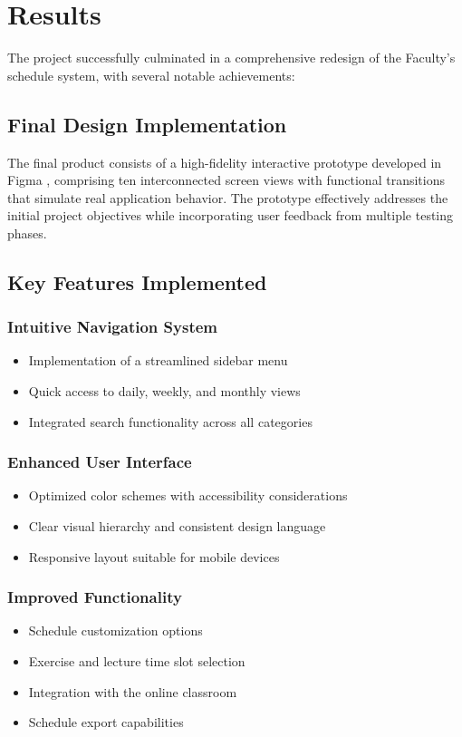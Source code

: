 \documentclass[sigconf,nonacm]{acmart}
\begin{document}
\section{Results}

The project successfully culminated in a comprehensive redesign of the Faculty's schedule system, with several notable achievements:

\subsection{Final Design Implementation}

The final product consists of a high-fidelity interactive prototype developed in Figma \cite{figma-link}, comprising ten interconnected screen views with functional transitions that simulate real application behavior. The prototype effectively addresses the initial project objectives while incorporating user feedback from multiple testing phases.

\subsection{Key Features Implemented}

\subsubsection{Intuitive Navigation System}
\begin{itemize}
    \item Implementation of a streamlined sidebar menu
    \item Quick access to daily, weekly, and monthly views
    \item Integrated search functionality across all categories
\end{itemize}

\subsubsection{Enhanced User Interface}
\begin{itemize}
    \item Optimized color schemes with accessibility considerations
    \item Clear visual hierarchy and consistent design language
    \item Responsive layout suitable for mobile devices
\end{itemize}

\subsubsection{Improved Functionality}
\begin{itemize}
    \item Schedule customization options
    \item Exercise and lecture time slot selection
    \item Integration with the online classroom
    \item Schedule export capabilities
\end{itemize}
\end{document}
